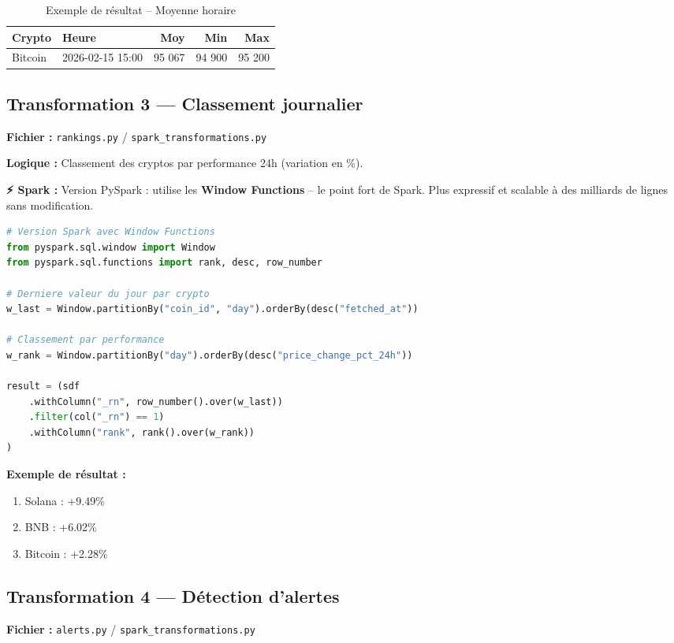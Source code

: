 \documentclass[12pt,a4paper]{article}
\newcommand{\sparkbox}[1]{%
  \vspace{4pt}
  \noindent\colorbox{orange!15}{\parbox{\dimexpr\linewidth-2\fboxsep}{%
    {\color{sparkcolor}\textbf{⚡ Spark :}} #1
  }}
  \vspace{4pt}
}
\begin{document}
\begin{table}[H]
\centering
\begin{tabular}{|l|l|r|r|r|}
\hline
\textbf{Crypto} & \textbf{Heure} & \textbf{Moy} & \textbf{Min} & \textbf{Max} \\
\hline
Bitcoin & 2026-02-15 15:00 & 95 067 & 94 900 & 95 200 \\
\hline
\end{tabular}
\caption{Exemple de résultat -- Moyenne horaire}
\end{table}

\subsection{Transformation 3 — Classement journalier}
\textbf{Fichier :} \texttt{rankings.py} / \texttt{spark\_transformations.py}

\textbf{Logique :} Classement des cryptos par performance 24h (variation en \%).

\sparkbox{Version PySpark : utilise les \textbf{Window Functions} -- le point fort de Spark. Plus expressif et scalable à des milliards de lignes sans modification.}

\begin{lstlisting}[language=Python]
# Version Spark avec Window Functions
from pyspark.sql.window import Window
from pyspark.sql.functions import rank, desc, row_number

# Derniere valeur du jour par crypto
w_last = Window.partitionBy("coin_id", "day").orderBy(desc("fetched_at"))

# Classement par performance
w_rank = Window.partitionBy("day").orderBy(desc("price_change_pct_24h"))

result = (sdf
    .withColumn("_rn", row_number().over(w_last))
    .filter(col("_rn") == 1)
    .withColumn("rank", rank().over(w_rank))
)
\end{lstlisting}

\textbf{Exemple de résultat :}
\begin{enumerate}[noitemsep]
    \item Solana : +9.49\%
    \item BNB : +6.02\%
    \item Bitcoin : +2.28\%
\end{enumerate}

\subsection{Transformation 4 — Détection d'alertes}
\textbf{Fichier :} \texttt{alerts.py} / \texttt{spark\_transformations.py}
\end{document}
